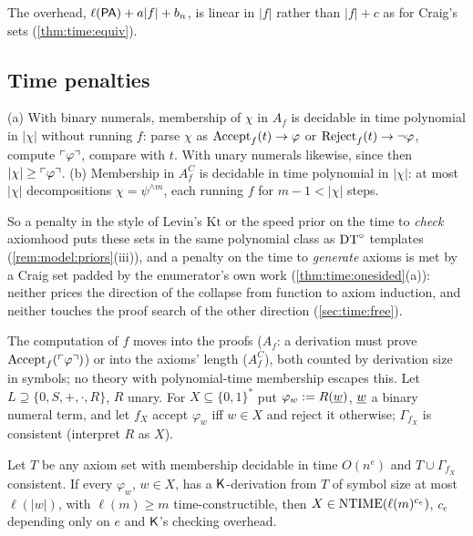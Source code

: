 The overhead, $\ell(\mathsf{PA})+a|f|+b_n$, is linear in $|f|$ rather than $|f|+c$ as for Craig's sets (\cref{thm:time:equiv}).

\subsection{Time penalties}\label{sec:time:penalties}

\begin{proposition}\label{prop:time:cheap}
(a) With binary numerals, membership of $\chi$ in $A_f$ is decidable in time polynomial in $|\chi|$ without running $f$: parse $\chi$ as $\mathrm{Accept}_{f}(t)\to\varphi$ or $\mathrm{Reject}_{f}(t)\to\neg\varphi$, compute $\ulcorner \varphi\urcorner$, compare with $t$. With unary numerals likewise, since then $|\chi|\ge\ulcorner \varphi\urcorner$.
(b) Membership in $A^C_f$ is decidable in time polynomial in $|\chi|$: at most $|\chi|$ decompositions $\chi=\psi^{\wedge m}$, each running $f$ for $m-1<|\chi|$ steps.
\end{proposition}

So a penalty in the style of Levin's $\mathrm{Kt}$ or the speed prior on the time to \emph{check} axiomhood puts these sets in the same polynomial class as $\mathrm{DT}^{\circ}$ templates (\cref{rem:model:priors}(iii)), and a penalty on the time to \emph{generate} axioms is met by a Craig set padded by the enumerator's own work (\cref{thm:time:onesided}(a)): neither prices the direction of the collapse from function to axiom induction, and neither touches the proof search of the other direction (\cref{sec:time:free}).

The computation of $f$ moves into the proofs ($A_f$: a derivation must prove $\mathrm{Accept}_{f}(\ulcorner \varphi\urcorner)$) or into the axioms' length ($A^C_f$), both counted by derivation size in symbols; no theory with polynomial-time membership escapes this. Let $L\supseteq\{0,S,+,\cdot,R\}$, $R$ unary. For $X\subseteq\{0,1\}^*$ put $\varphi_w:=R(\underline{w})$, $\underline{w}$ a binary numeral term, and let $f_X$ accept $\varphi_w$ iff $w\in X$ and reject it otherwise; $\Gamma_{f_X}$ is consistent (interpret $R$ as $X$).

\begin{theorem}\label{thm:time:ntime}
Let $T$ be any axiom set with membership decidable in time $O(n^e)$ and $T\cup\Gamma_{f_X}$ consistent. If every $\varphi_w$, $w\in X$, has a $\mathsf{K}$-derivation from $T$ of symbol size at most $\ell(|w|)$, with $\ell(m)\ge m$ time-constructible, then $X\in\mathrm{NTIME}(\ell(m)^{c_e})$, $c_e$ depending only on $e$ and $\mathsf{K}$'s checking overhead.
\end{theorem}

